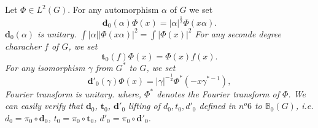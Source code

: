 \documentclass[12pt]{amsart}
\newenvironment{expl}{\it}{\color{black}\normalsize}
\def\bB{{\mathbb{B}}}
\def\bd{{\mathbf{d}}}
\def\bt{{\mathbf{t}}}
\def\abs#1{\left|{#1}\right|}
\begin{document}
Let $\Phi\in L^2(G)$. For any automorphism $\alpha$ of $G$ 
we set
\[
\bd_0(\alpha)\Phi(x)=\abs{\alpha}^{\frac{1}{2}}\Phi(x\alpha).
\]
\begin{expl}
$\bd_0(\alpha)$ is unitary.
$\int \abs{\alpha}\abs{\Phi(x\alpha)}^2 = \int \abs{\Phi(x)}^2$
\end{expl}
For any seconde degree characher $f$ of $G$, we set
\[
\bt_0(f)\Phi(x) = \Phi(x)f(x).
\]
For any isomorphism $\gamma$ from $G^*$ to $G$, we set
\[
\bd'_0(\gamma)\Phi(x) = |\gamma|^{-\frac{1}{2}} \Phi^*(-x\gamma^{*-1}),
\]
\begin{expl}
Fourier transform is unitary.
\end{expl}
where, $\Phi^*$ denotes the Fourier transform of $\Phi$.
We can easily verify that $\bd_0$, $\bt_0$, $\bd'_0$ lifting of  
$d_0, t_0, d'_0$ defined in $n^o 6$ to  $\bB_0(G)$, 
i.e. $d_0 = \pi_0 \circ \bd_0$, $t_0=\pi_0\circ \bt_0$, 
$d'_0 = \pi_0 \circ \bd'_0$. 
\end{document}
